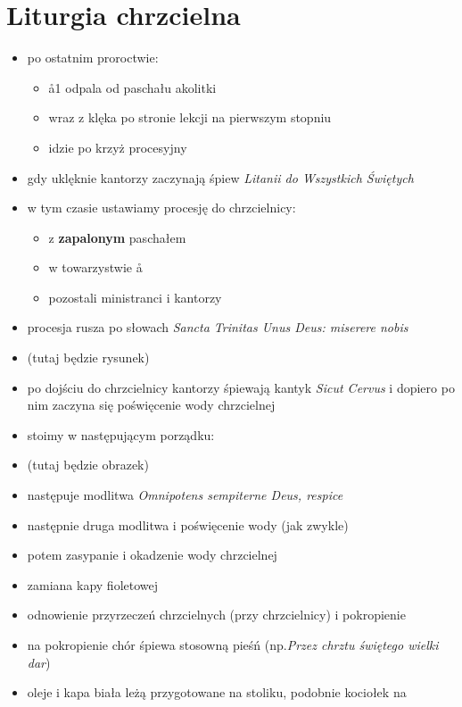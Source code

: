 \section{Liturgia chrzcielna}

\begin{itemize}
	\item po ostatnim proroctwie:
	      \begin{itemize}
		      \item \aa1 odpala od paschału akolitki
		      \item \ii wraz z \cc klęka po stronie lekcji na pierwszym stopniu
		      \item {} idzie po krzyż procesyjny
	      \end{itemize}
	\item gdy \ii uklęknie kantorzy zaczynają śpiew \textit{Litanii do Wszystkich Świętych}
	\item w tym czasie ustawiamy procesję do chrzcielnicy:
	      \begin{itemize}
		      \item {} z \textbf{zapalonym} paschałem
		      \item {} w towarzystwie \aa
		      \item pozostali ministranci i kantorzy
	      \end{itemize}
	\item procesja rusza po słowach \textit{Sancta Trinitas Unus Deus: miserere nobis}
	\item (tutaj będzie rysunek)
	\item po dojściu do chrzcielnicy kantorzy śpiewają kantyk \textit{Sicut
		      Cervus} i dopiero po nim zaczyna się poświęcenie wody chrzcielnej
	\item stoimy w następującym porządku:
	\item (tutaj będzie obrazek)
	\item następuje modlitwa \textit{Omnipotens sempiterne Deus, respice}
	\item następnie druga modlitwa i poświęcenie wody (jak zwykle)
	\item potem zasypanie i okadzenie wody chrzcielnej
	\item zamiana kapy fioletowej
	\item odnowienie przyrzeczeń chrzcielnych (przy chrzcielnicy) i pokropienie
	\item na pokropienie chór śpiewa stosowną pieśń (np.\textit{Przez chrztu
		      świętego wielki dar})
	\item oleje i kapa biała leżą przygotowane na stoliku, podobnie kociołek na

\end{itemize}

